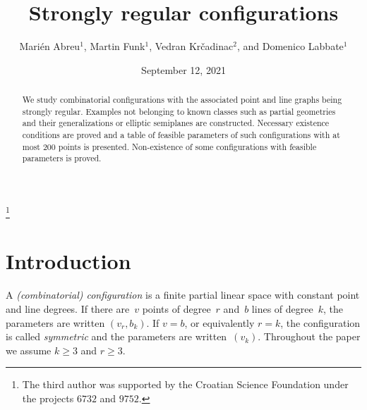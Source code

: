 \documentclass[12pt, reqno]{amsart}
\begin{document}
\title{Strongly regular configurations}

\author[M.~Abreu, M.~Funk, V.~Kr\v{c}adinac, and D.~Labbate]{Mari\'{e}n Abreu$^1$, Martin Funk$^1$,
Vedran Kr\v{c}adinac$^2$, and Domenico Labbate$^1$}

\address{$^1$Dipartimento di Matematica, Informatica ed Economia,
Universit\`{a} degli Studi della Basilicata,
Viale dell'Ateneo Lucano~10, Potenza, Italy}

\address{$^2$Department of Mathematics, Faculty of Science, University of Zagreb,
Bijeni\v{c}ka cesta~30, HR-10000 Zagreb, Croatia}


\thanks{The third author was supported by
the Croatian Science Foundation under the projects
$6732$ and $9752$.}



\date{September 12, 2021}

\maketitle

\begin{abstract}
We study combinatorial configurations with the associated point and
line graphs being strongly regular. Examples not belonging to known
classes such as partial geometries and their generalizations or elliptic
semiplanes are constructed. Necessary existence conditions are proved and
a table of feasible parameters of such configurations with at most $200$
points is presented. Non-existence of some configurations with feasible
parameters is proved.
\end{abstract}


\section{Introduction}

A \emph{(combinatorial) configuration} is a finite partial linear space with constant point and line degrees.
If there are~$v$ points of degree~$r$ and~$b$ lines of degree~$k$, the parameters are written
$(v_r,b_k)$. If $v=b$, or equivalently $r=k$, the configuration is called \emph{symmetric} and
the parameters are written~$(v_k)$. Throughout the paper we assume $k\ge 3$ and $r\ge 3$.
\end{document}
